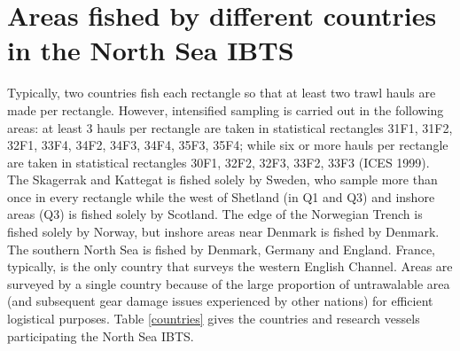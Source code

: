 \documentclass[a4paper 12pt]{article}
\numberwithin{equation}{section}
\begin{document}
\setcounter{table}{0}


\section{\large Areas fished by different countries in the North Sea IBTS}
\label{secAp:areasfishedappendix}
Typically, two countries fish each rectangle so that at least two trawl hauls are made per rectangle. However, intensified sampling is carried out in the following areas: at least 3 hauls per rectangle are taken in statistical rectangles  31F1, 31F2, 32F1, 33F4, 34F2, 34F3, 34F4, 35F3, 35F4; while six or more hauls per rectangle are taken in statistical rectangles  30F1, 32F2, 32F3, 33F2, 33F3 (ICES 1999).  The Skagerrak and Kattegat is fished solely by Sweden, who sample more than once in every rectangle while the west of Shetland (in Q1 and Q3) and inshore areas (Q3) is fished solely by Scotland. The edge of the Norwegian Trench is fished solely by Norway, but inshore areas near Denmark is fished by Denmark. The southern North Sea is fished by Denmark, Germany and England. France, typically, is the only country that surveys the western English Channel. Areas are surveyed by a single country because of the large proportion of untrawalable area (and subsequent gear damage issues experienced by other nations)  for efficient logistical purposes. Table \ref{countries} gives the countries and research vessels participating the North Sea IBTS.\\
\end{document}
